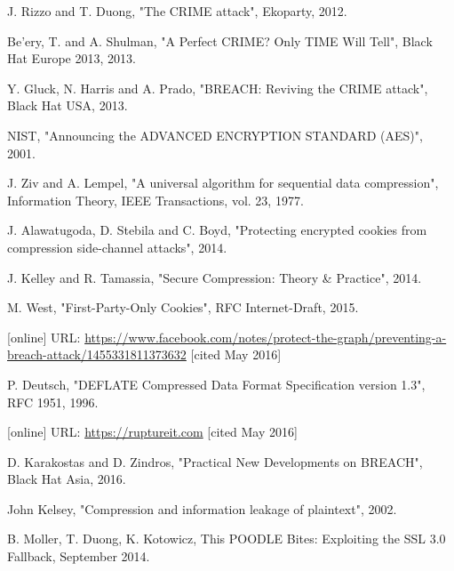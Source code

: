 \documentclass{sig-alternate-05-2015}
\begin{document}
\begin{thebibliography}{13}

 J. Rizzo and T. Duong, "The CRIME attack", Ekoparty, 2012.

 Be'ery, T. and A. Shulman, "A Perfect CRIME? Only TIME Will Tell",
Black Hat Europe 2013, 2013.

 Y. Gluck, N. Harris and A. Prado, "BREACH: Reviving the CRIME attack",
Black Hat USA, 2013.

 NIST, "Announcing the ADVANCED ENCRYPTION STANDARD (AES)", 2001.

 J. Ziv and A. Lempel, "A universal algorithm for sequential data
compression", Information Theory, IEEE Transactions, vol. 23, 1977.

 J. Alawatugoda, D. Stebila and C. Boyd, "Protecting encrypted
cookies from compression side-channel attacks", 2014.

 J. Kelley and R. Tamassia, "Secure Compression: Theory \& Practice",
2014.

 M. West, "First-Party-Only Cookies", RFC Internet-Draft, 2015.

 [online] URL:
\url{https://www.facebook.com/notes/protect-the-graph/preventing-a-breach-attack/1455331811373632}
[cited May 2016]

 P. Deutsch, "DEFLATE Compressed Data Format Specification version
1.3", RFC 1951, 1996.

 [online] URL: \url{https://ruptureit.com} [cited May 2016]

 D. Karakostas and D. Zindros, "Practical New Developments on
BREACH", Black Hat Asia, 2016.

 John Kelsey, "Compression and information leakage of plaintext", 2002.

 B. Moller, T. Duong, K. Kotowicz, This POODLE Bites: Exploiting the SSL 3.0 Fallback, September 2014.

\end{thebibliography}
\end{document}
